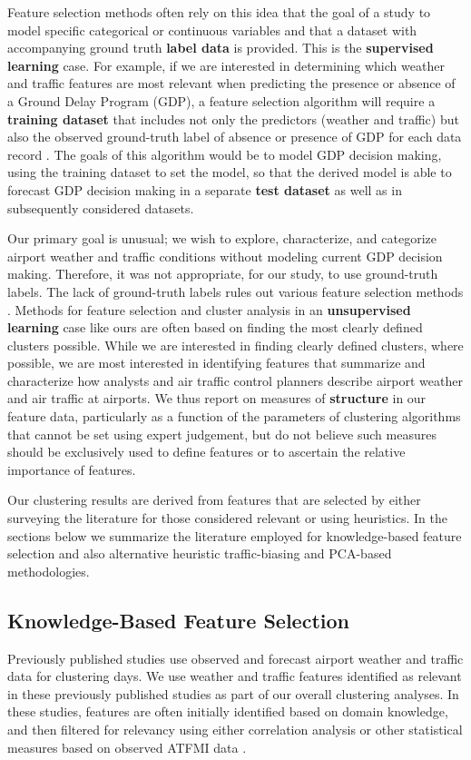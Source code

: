\documentclass[11pt]{scrartcl}
\begin{document}
Feature selection methods often rely on this idea that the goal of a study to model specific categorical or continuous variables and that a dataset with accompanying ground truth {\bf label data} is provided.  This is the {\bf supervised learning} case.  For example, if we are interested in determining which weather and traffic features are most relevant when predicting the presence or absence of a Ground Delay Program (GDP), a feature selection algorithm will require a {\bf training dataset} that includes not only the predictors (weather and traffic) but also the observed ground-truth label of absence or presence of GDP for each data record \cite{mukherjeepredicting}.  The goals of this algorithm would be to model GDP decision making, using the training dataset to set the model, so that the derived model is able to forecast GDP decision making in a separate {\bf test dataset} as well as in subsequently considered datasets.

Our primary goal is unusual; we wish to explore, characterize, and categorize airport weather and traffic conditions without modeling current GDP decision making.  Therefore, it was not appropriate, for our study, to use ground-truth labels.  The lack of ground-truth labels rules out various feature selection methods \cite{guyon2003introduction}.  Methods for feature selection and cluster analysis in an {\bf unsupervised learning} case like ours are often based on finding the most clearly defined clusters possible.  While we are interested in finding clearly defined clusters, where possible, we are most interested in identifying features that summarize and characterize how analysts and air traffic control planners describe airport weather and air traffic at airports.  We thus report on measures of {\bf structure} in our feature data, particularly as a function of the parameters of clustering algorithms that cannot be set using expert judgement, but do not believe such measures should be exclusively used to define features or to ascertain the relative importance of features.

Our clustering results are derived from features that are selected by either surveying the literature for those considered relevant or using heuristics.  In the sections below we summarize the literature employed for knowledge-based feature selection and also alternative heuristic traffic-biasing and PCA-based methodologies.
\subsection{Knowledge-Based Feature Selection}
Previously published studies use observed and forecast airport weather and traffic data for clustering days.  We use weather and traffic features identified as relevant in these previously published studies as part of our overall clustering analyses.  In these studies, features are often initially identified based on domain knowledge, and then filtered for relevancy using either correlation analysis or other statistical measures based on observed ATFMI data \cite{mukherjeepredicting,grabbe2013similar}.  
\end{document}

